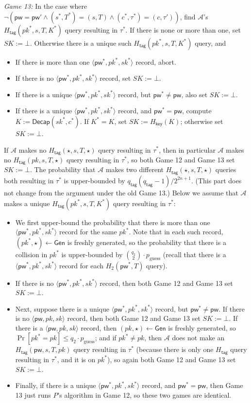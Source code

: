 \documentclass{article}
\theoremstyle{plain}
\theoremstyle{definition}
\theoremstyle{remark}
\newcommand{\adv}{\mathcal{A}}
\newcommand{\Gen}{\mathsf{Gen}}
\newcommand{\Decap}{\mathsf{Decap}}
\newcommand{\Hkey}{H_\mathsf{key}}
\newcommand{\Htag}{H_\mathsf{tag}}
\newcommand{\pw}{\mathsf{pw}}
\newcommand{\qtag}{q_\mathsf{tag}}
\begin{document}
\medskip\noindent\emph{Game 13:} In the case where $\neg(\pw = \pw' \land (s^*,T^*) = (s,T) \land (c^*,\tau^*) = (c,\tau'))$, find $\adv$'s $\Htag(pk^*,s,T,K^*)$ query resulting in $\tau^*$. If there is none or more than one, set $SK := \bot$. Otherwise there is a unique such $\Htag(pk^*,s,T,K^*)$ query, and
\begin{itemize}
  \item If there is more than one $\langle\pw^*,pk^*,sk^*\rangle$ record, abort.
  \item If there is no $\langle\pw^*,pk^*,sk^*\rangle$ record, set $SK := \bot$.
  \item If there is a unique $\langle\pw^*,pk^*,sk^*\rangle$ record, but $\pw^* \neq \pw$, also set $SK := \bot$.
  \item If there is a unique $\langle\pw^*,pk^*,sk^*\rangle$ record, and $\pw^* = \pw$, compute $K := \Decap(sk^*,c^*)$. If $K^* = K$, set $SK := \Hkey(K)$; otherwise set $SK := \bot$.
\end{itemize}

If $\adv$ makes no $\Htag(\star,s,T,\star)$ query resulting in $\tau^*$, then in particular $\adv$ makes no $\Htag(pk,s,T,\star)$ query resulting in $\tau^*$, so both Game 12 and Game 13 set $SK := \bot$. The probability that $\adv$ makes two different $\Htag(\star,s,T,\star)$ queries both resulting in $\tau^*$ is upper-bounded by $\qtag(\qtag-1)/2^{2n+1}$. (This part does not change from the argument under the old Game 13.) Below we assume that $\adv$ makes a unique $\Htag(pk^*,s,T,K^*)$ query resulting in $\tau^*$:
\begin{itemize}
  \item We first upper-bound the probability that there is more than one $\langle\pw^*,pk^*,\allowbreak sk^*\rangle$ record for the same $pk^*$. Note that in each such record, $(pk^*,\star) \gets \Gen$ is freshly generated, so the probability that there is a collision in $pk^*$ is upper-bounded by ${q_2 \choose 2} \cdot p_\text{guess}$ (recall that there is a $\langle\pw^*,pk^*,sk^*\rangle$ record for each $H_2(\pw^*,T)$ query).
  \item If there is no $\langle\pw^*,pk^*,sk^*\rangle$ record, then both Game 12 and Game 13 set $SK := \bot$.
  \item Next, suppose there is a unique $\langle\pw^*,pk^*,sk^*\rangle$ record, but $\pw^* \neq \pw$. If there is no $\langle\pw,pk,sk\rangle$ record, then both Game 12 and Game 13 set $SK := \bot$. If there is a $\langle\pw,pk,sk\rangle$ record, then $(pk,\star) \gets \Gen$ is freshly generated, so $\Pr[pk^* = pk] \leq q_2 \cdot p_\text{guess}$; and if $pk^* \neq pk$, then $\adv$ does not make an $\Htag(\pw,s,T,pk)$ query resulting in $\tau^*$ (because there is only one $\Htag$ query resulting in $\tau^*$, and it is on $pk^*$), so again both Game 12 and Game 13 set $SK := \bot$.
  \item Finally, if there is a unique $\langle\pw^*,pk^*,sk^*\rangle$ record, and $\pw^* = \pw$, then Game 13 just runs $P$'s algorithm in Game 12, so these two games are identical.
\end{itemize}
\end{document}
